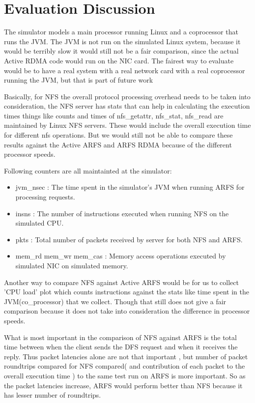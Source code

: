 \documentclass[10pt]{article}
\begin{document}

\section{Evaluation Discussion}
The simulator models a main processor running Linux and a coprocessor that
runs the JVM. The JVM is not run on the simulated Linux system, because
it would be terribly slow it would still not be a fair comparison, since
the actual Active RDMA code would run on the NIC card. The fairest
way to evaluate would be to have a real system with a real network card
with a real coprocessor running the JVM, but that is part of future work


Basically, for NFS the overall protocol processing overhead needs to be
taken into consideration, the NFS server has stats that can help
in calculating the execution times things like counts and times of
nfs_getattr, nfs_stat, nfs_read are maintained by Linux NFS servers. These
would include the overall execution time for different nfs operations. But 
we would still not be able to compare these results against the Active ARFS
and ARFS RDMA because of the different processor speeds.

Following counters are all maintainted at the simulator:
\begin{itemize}
\item jvm_nsec : The time spent in the simulator's JVM when running ARFS for processing requests.
\item  insns : The number of instructions executed when running NFS on the simulated CPU.
\item pkts : Total number of packets received by server for both NFS and ARFS.
\item mem_rd mem_wr mem_cas : Memory access operations executed by simulated NIC on simulated memory.
\end{itemize}

Another way to compare NFS against Active ARFS would be for us to collect
'CPU load' plot which counts instructions against the stats like
time spent in the JVM(co_processor) that we collect. Though that still
does not give a fair comparison because it does not take into consideration
the difference in processor speeds.

What is most important in the comparison of NFS against ARFS is the total
time between when the client sends the DFS request and when it receives the
reply. Thus packet latencies alone are not that important , but number of packet
roundtrips compared for NFS compared( and contribution of each packet to the
overall execution time ) to the same test run on ARFS is more important. So
as the packet latencies increase, ARFS would perform better than NFS because
it has lesser number of roundtrips.
\end{document}
